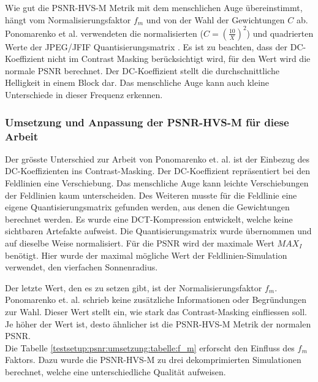 Wie gut die PSNR-HVS-M Metrik mit dem menschlichen Auge übereinstimmt, hängt vom Normalisierungsfaktor $f_m$ und von der Wahl der Gewichtungen $C$ ab. Ponomarenko et al. verwendeten die normalisierten ($C= (\frac{10}{X})^2$) und quadrierten Werte der JPEG/JFIF Quantisierungsmatrix \cite{wallace1992jpeg}. Es ist zu beachten, dass der DC-Koeffizient \cite{wiki:dccoeff} nicht im Contrast Masking berücksichtigt wird, für den Wert wird die normale PSNR berechnet. Der DC-Koeffizient stellt die durchschnittliche Helligkeit in einem Block dar. Das menschliche Auge kann auch kleine Unterschiede in dieser Frequenz erkennen.

\subsubsection{Umsetzung und Anpassung der PSNR-HVS-M für diese Arbeit}
Der grösste Unterschied zur Arbeit von Ponomarenko et. al. ist der Einbezug des DC-Koeffizienten ins Contrast-Masking. Der DC-Koeffizient repräsentiert bei den Feldlinien eine Verschiebung. Das menschliche Auge kann leichte Verschiebungen der Feldlinien kaum unterscheiden. Des Weiteren musste für die Feldlinie eine eigene Quantisierungsmatrix gefunden werden, aus denen die Gewichtungen berechnet werden. Es wurde eine DCT-Kompression entwickelt, welche keine sichtbaren Artefakte aufweist. Die Quantisierungsmatrix wurde übernommen und auf dieselbe Weise normalisiert. Für die PSNR wird der maximale Wert $MAX_I$ benötigt. Hier wurde der maximal mögliche Wert der Feldlinien-Simulation verwendet, den vierfachen Sonnenradius.

Der letzte Wert, den es zu setzen gibt, ist der Normalisierungsfaktor $f_m$. Ponomarenko et. al. schrieb keine zusätzliche Informationen oder Begründungen zur Wahl. Dieser Wert stellt ein, wie stark das Contrast-Masking einfliessen soll. Je höher der Wert ist, desto ähnlicher ist die PSNR-HVS-M Metrik der normalen PSNR.\\
Die Tabelle \ref{testsetup:psnr:umsetzung:tabelle:f_m} erforscht den Einfluss des $f_m$ Faktors. Dazu wurde die PSNR-HVS-M zu drei dekomprimierten Simulationen berechnet, welche eine unterschiedliche Qualität aufweisen.

